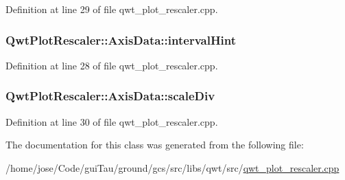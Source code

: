 Definition at line 29 of file qwt\-\_\-plot\-\_\-rescaler.\-cpp.

\hypertarget{class_qwt_plot_rescaler_1_1_axis_data_a191f54710ba6489d5bd8236cef9479b9}{
\subsubsection[{interval\-Hint}]{ Qwt\-Plot\-Rescaler\-::\-Axis\-Data\-::interval\-Hint}}\label{class_qwt_plot_rescaler_1_1_axis_data_a191f54710ba6489d5bd8236cef9479b9}


Definition at line 28 of file qwt\-\_\-plot\-\_\-rescaler.\-cpp.

\hypertarget{class_qwt_plot_rescaler_1_1_axis_data_abba86d379087bbe8d056fcd22fc93927}{
\subsubsection[{scale\-Div}]{ Qwt\-Plot\-Rescaler\-::\-Axis\-Data\-::scale\-Div\hspace{0.3cm}{\ttfamily [mutable]}}}\label{class_qwt_plot_rescaler_1_1_axis_data_abba86d379087bbe8d056fcd22fc93927}


Definition at line 30 of file qwt\-\_\-plot\-\_\-rescaler.\-cpp.



The documentation for this class was generated from the following file\-:\begin{DoxyCompactItemize}
\item 
/home/jose/\-Code/gui\-Tau/ground/gcs/src/libs/qwt/src/\hyperlink{qwt__plot__rescaler_8cpp}{qwt\-\_\-plot\-\_\-rescaler.\-cpp}\end{DoxyCompactItemize}
